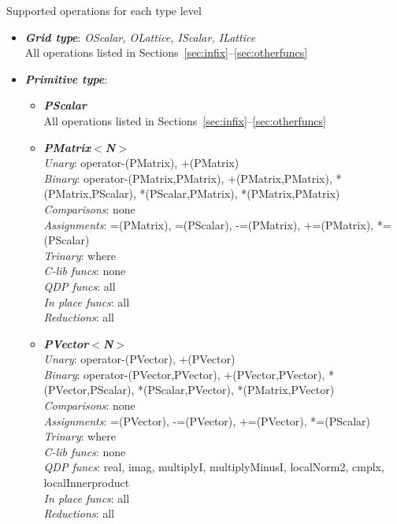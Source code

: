\documentclass[12pt,letterpaper]{article}
\begin{document}
Supported operations for each type level
\begin{itemize}
\item
{\bf\em Grid type}: {\em OScalar, OLattice, IScalar, ILattice}\\
All operations listed in Sections~\ref{sec:infix}--\ref{sec:otherfuncs}

\item
{\bf\em Primitive type}:
\begin{itemize}
\item
{\bf\em PScalar}\\
All operations listed in Sections~\ref{sec:infix}--\ref{sec:otherfuncs}

\item
{\bf\em PMatrix$<$N$>$}\\
  {\em Unary}: operator-(PMatrix), +(PMatrix)\\
  {\em Binary}: operator-(PMatrix,PMatrix), +(PMatrix,PMatrix), *(PMatrix,PScalar), 
       *(PScalar,PMatrix), *(PMatrix,PMatrix)\\
  {\em Comparisons}: none\\
  {\em Assignments}: =(PMatrix), =(PScalar), -=(PMatrix), +=(PMatrix), *=(PScalar)\\
  {\em Trinary}: where\\
  {\em C-lib funcs}: none\\
  {\em QDP funcs}: all\\
  {\em In place funcs}: all\\
  {\em Reductions}: all\\

\item
{\bf\em PVector$<$N$>$}\\
  {\em Unary}: operator-(PVector), +(PVector)\\
  {\em Binary}: operator-(PVector,PVector), +(PVector,PVector), *(PVector,PScalar), 
       *(PScalar,PVector), *(PMatrix,PVector)\\
  {\em Comparisons}: none\\
  {\em Assignments}: =(PVector), -=(PVector), +=(PVector), *=(PScalar)\\
  {\em Trinary}: where\\
  {\em C-lib funcs}: none\\
  {\em QDP funcs}: real, imag, multiplyI, multiplyMinusI, localNorm2, cmplx, 
	localInnerproduct\\
  {\em In place funcs}: all\\
  {\em Reductions}: all\\


\end{itemize}
\end{itemize}
\end{document}
